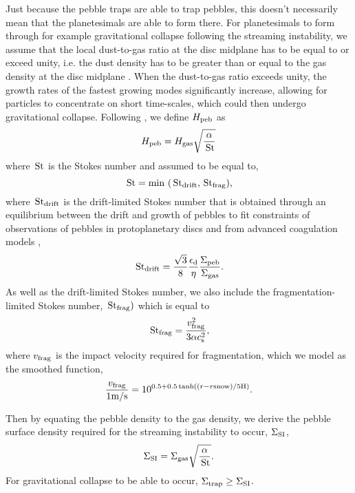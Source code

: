 \documentclass[a4paper,fleqn,usenatbib]{mnras}
\newcommand{\Stokes}{{\, {\rm St}}}
\begin{document}
Just because the pebble traps are able to trap pebbles, this doesn't necessarily mean that the planetesimals are able to form there.
For planetesimals to form through for example gravitational collapse following the streaming instability, we assume that the local dust-to-gas ratio at the disc midplane has to be equal to or exceed unity, i.e. the dust density has to be greater than or equal to the gas density at the disc midplane \citep{Youdin05}.
When the dust-to-gas ratio exceeds unity, the growth rates of the fastest growing modes significantly increase, allowing for particles to concentrate on short time-scales, which could then undergo gravitational collapse.
Following \citet{Youdin07}, we define $H_{\rm peb}$ as
\begin{equation}
    H_{\rm peb} = H_{\rm gas}\sqrt{\dfrac{\alpha}{\Stokes}}
\end{equation}
where $\Stokes$ is the Stokes number and assumed to be equal to,
\begin{equation}
\Stokes = {\rm min}~(\Stokes_{\rm drift}, \Stokes_{\rm frag}),
\end{equation}
where $\Stokes_{\rm drift}$ is the drift-limited Stokes number that is obtained through an equilibrium between the drift and growth of pebbles to fit constraints of observations of pebbles in protoplanetary discs and from advanced coagulation models \citep{Birnstiel12},
\begin{equation}
    \Stokes_{\rm drift} = \frac{\sqrt{3}}{8}\frac{\epsilon_{\rm d}}{\eta}\frac{\Sigma_{\rm peb}}{\Sigma_{\rm gas}}.
\end{equation}
As well as the drift-limited Stokes number, we also include the fragmentation-limited Stokes number, $\Stokes_{\rm frag})$ which is equal to
\begin{equation}
    \Stokes_{\rm frag} = \frac{v_{\rm frag}^2}{3 \alpha c_{\rm s}^2},
\end{equation}
where $v_{\rm frag}$ is the impact velocity required for fragmentation, which we model as the smoothed function,
\begin{equation}
    \frac{v_{\rm frag}}{\rm 1m/s} = 10^{0.5+0.5 \tanh((r-r\rm snow)/5H)}.
\end{equation}

Then by equating the pebble density to the gas density, we derive the pebble surface density required for the streaming instability to occur, $\Sigma_{\rm SI}$,
\begin{equation}
\label{eq:sig_SI}
\Sigma_{\rm SI} = \Sigma_{\rm gas}\sqrt{\dfrac{\alpha}{\Stokes}}.
\end{equation}
For gravitational collapse to be able to occur, $\Sigma_{\rm trap} \ge \Sigma_{\rm SI}$.
\end{document}
